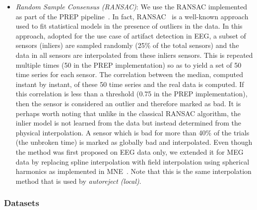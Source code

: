 \begin{itemize}[noitemsep,nolistsep]
\item \emph{Random Sample Consensus (RANSAC)}: We use the RANSAC implemented as part of the PREP pipeline~\citep{bigdely2015prep}. In fact, RANSAC~\citep{fischler1981random} is a well-known approach used to fit statistical models in the presence of outliers in the data. In this approach, adopted for the use case of artifact detection in EEG, a subset of sensors (inliers) are sampled randomly (25\% of the total sensors) and the data in all sensors are interpolated from these inliers sensors. This is repeated multiple times (50 in the PREP implementation) so as to yield a set of 50 time series for each sensor. The correlation between the median, computed instant by instant, of these 50 time series and the real data is computed. If this correlation is less than a threshold (0.75 in the PREP implementation), then the sensor is considered an outlier and therefore marked as bad. It is perhaps worth noting that unlike in the classical RANSAC algorithm, the inlier model is not learned from the data but instead determined from the physical interpolation. A sensor which is bad for more than 40\% of the trials (the unbroken time) is marked as globally bad and interpolated. Even though the method was first proposed on EEG data only, we extended it for MEG data by replacing spline interpolation with field interpolation using spherical harmonics as implemented in MNE~\citep{gramfort2013meg,hamalainen1994interpreting}. Note that this is the same interpolation method that is used by \emph{autoreject (local)}.
\end{itemize}

\subsubsection{Datasets}
\label{sec:datasets}

\begin{table}[!t]
{
    \caption{Overview of datasets analyzed\label{tab:datasets}}
    \label{table:datasets}
}
\end{table}

